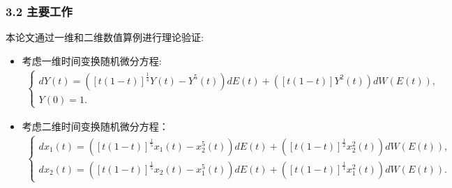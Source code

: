 \documentclass[notheorems,10pt,compress]{beamer}
\numberwithin{figure}{section}
\numberwithin{table}{section}
\numberwithin{equation}{section}
\numberwithin{theorem}{section}
\numberwithin{definition}{section}
\numberwithin{lemma}{section}
\numberwithin{proposition}{section}
\numberwithin{corollary}{section}
\theoremstyle{example}
\begin{document}
     \begin{frame}		
      \frametitle{ 3.2 主要工作}
       \setlength{\parindent}{2em}本论文通过一维和二维数值算例进行理论验证:
       \vskip 5pt
      \begin{itemize}
          \setlength{\itemsep}{5pt}
            \item 考虑一维时间变换随机微分方程:
             \begin{align*}
                 \left\{
                 \begin{array}{lr}
                     dY(t)=\left([t(1-t)]^{\frac{1}{4}}Y(t)-Y^5(t)\right)dE(t)+\left([t(1-t)]Y^2(t)\right)dW(E(t)),&\\
                     Y(0)=1.&
                 \end{array}
                 \right.
             \end{align*}
         \item 考虑二维时间变换随机微分方程：
         \begin{align*}
             \label{ex2}
             \left\{
             \begin{array}{lr}
                 dx_1(t)=\left([t(1-t)]^{\frac{1}{5}}x_1(t)-x_2^5(t)\right)dE(t)+\left([t(1-t)]^{\frac{1}{2}}x_2^2(t)\right)dW(E(t)),&\\
                 dx_2(t)=\left([t(1-t)]^{\frac{1}{5}}x_2(t)-x_1^5(t)\right)dE(t)+\left([t(1-t)]^{\frac{1}{1}}x_1^2(t)\right)dW(E(t)).&
             \end{array}
             \right.
         \end{align*}
       \end{itemize}
        \end{frame}
    
\end{document}
